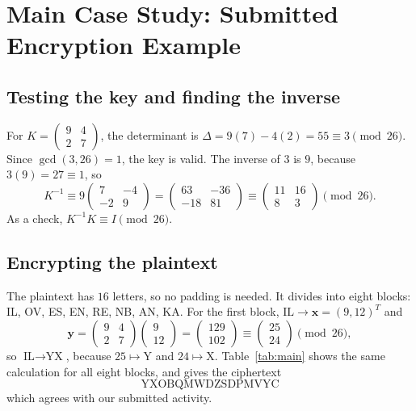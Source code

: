 \documentclass[11pt,a4paper]{article}
\newcommand{\vect}[1]{\begin{pmatrix}#1\end{pmatrix}}
\newcommand{\smat}[1]{\left(\begin{smallmatrix}#1\end{smallmatrix}\right)}
\newcommand{\x}{\mathbf{x}}   %
\newcommand{\y}{\mathbf{y}}   %
\theoremstyle{plain}
\theoremstyle{definition}
\begin{document}
\section{Main Case Study: Submitted Encryption Example}\label{sec:main}

\subsection{Testing the key and finding the inverse}

For $K=\smat{9&4\\2&7}$, the determinant is $\Delta=9(7)-4(2)=55\equiv3\pmod{26}$. Since $\gcd(3,26)=1$, the key is valid. The inverse of $3$ is $9$, because $3(9)=27\equiv1$, so
\[
K^{-1}\equiv9\vect{7&-4\\-2&9}=\vect{63&-36\\-18&81}\equiv\vect{11&16\\8&3}\pmod{26}.
\]
As a check, $K^{-1}K\equiv I\pmod{26}$.

\subsection{Encrypting the plaintext}

The plaintext has $16$ letters, so no padding is needed. It divides into eight blocks: IL, OV, ES, EN, RE, NB, AN, KA. For the first block, $\text{IL}\longrightarrow\x=(9,12)^T$ and
\[
\y=\vect{9&4\\2&7}\vect{9\\12}=\vect{129\\102}\equiv\vect{25\\24}\pmod{26},
\]
so $\text{IL}\longrightarrow\text{YX}$, because $25\mapsto\text{Y}$ and $24\mapsto\text{X}$. Table~\ref{tab:main} shows the same calculation for all eight blocks, and gives the ciphertext
\[
\boxed{\text{YXOBQMWDZSDPMVYC}}
\]
which agrees with our submitted activity.
\end{document}
